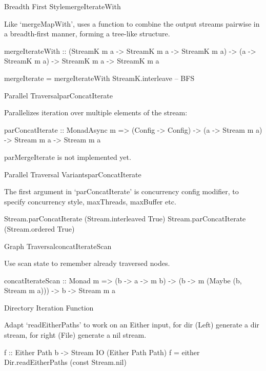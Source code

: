 \documentclass[17pt]{beamer}
\begin{document}
\begin{frame}[fragile]{Breadth First Style}{mergeIterateWith}

Like `mergeMapWith', uses a function to combine the output streams
pairwise in a breadth-first manner, forming a tree-like structure.
\begin{code}
mergeIterateWith
 :: (StreamK m a -> StreamK m a -> StreamK m a)
 -> (a -> StreamK m a)
 -> StreamK m a
 -> StreamK m a

mergeIterate = mergeIterateWith StreamK.interleave -- BFS
\end{code}
\end{frame}

\begin{frame}[fragile]{Parallel Traversal}{parConcatIterate}

Parallelizes iteration over multiple elements of the stream:
\begin{code}
parConcatIterate :: MonadAsync m
 => (Config -> Config)
 -> (a -> Stream m a)
 -> Stream m a
 -> Stream m a
\end{code}

parMergeIterate is not implemented yet.

\end{frame}

\begin{frame}[fragile]{Parallel Traversal Variants}{parConcatIterate}

The first argument in `parConcatIterate' is concurrency config modifier, to specify concurrency
style, maxThreads, maxBuffer etc.
\begin{code}
Stream.parConcatIterate (Stream.interleaved True)
Stream.parConcatIterate (Stream.ordered True)
\end{code}

\end{frame}

\begin{frame}[fragile]{Graph Traversal}{concatIterateScan}

Use scan state to remember already traversed nodes.
\begin{code}
concatIterateScan :: Monad m 
  => (b -> a -> m b) 
  -> (b -> m (Maybe (b, Stream m a))) 
  -> b 
  -> Stream m a
\end{code}

\end{frame}

\begin{frame}[fragile]{Directory Iteration Function}
{}

Adapt `readEitherPaths' to work on an Either input, for dir (Left)
generate a dir stream, for right (File) generate a nil stream.
\begin{code}
f :: Either Path b -> Stream IO (Either Path Path)
f = either Dir.readEitherPaths (const Stream.nil)
\end{code}
\end{frame}
\end{document}
